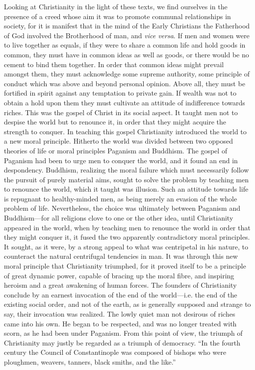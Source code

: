 \documentclass{book}
\begin{document}
Looking at Christianity in the light of these texts, we find ourselves in the presence of a creed whose aim it was to promote communal relationships in society, for it is manifest that in the mind of the Early Christians the Fatherhood of God involved the Brotherhood of man, and \emph{vice versa}. If men and women were to live together as equals, if they were to share a common life and hold goods in common, they must have in common ideas as well as goods, or there would be no cement to bind them together. In order that common ideas might prevail amongst them, they must acknowledge some supreme authority, some principle of conduct which was above and beyond personal opinion. Above all, they must be fortified in spirit against any temptation to private gain. If wealth was not to obtain a hold upon them they must cultivate an attitude of indifference towards riches. This was the gospel of Christ in its social aspect. It taught men not to despise the world but to renounce it, in order that they might acquire the strength to conquer. In teaching this gospel Christianity introduced the world to a new moral principle. Hitherto the world was divided between two opposed theories of life or moral principles Paganism and Buddhism. The gospel of Paganism had been to urge men to conquer the world, and it found an end in despondency. Buddhism, realizing the moral failure which must necessarily follow the pursuit of purely material aims, sought to solve the problem by teaching men to renounce the world, which it taught was illusion. Such an attitude towards life is repugnant to healthy-minded men, as being merely an evasion of the whole problem of life. Nevertheless, the choice was ultimately between Paganism and Buddhism—for all religions clove to one or the other idea, until Christianity appeared in the world, when by teaching men to renounce the world in order that they might conquer it, it fused the two apparently contradictory moral principles. It sought, as it were, by a strong appeal to what was centripetal in his nature, to counteract the natural centrifugal tendencies in man. It was through this new moral principle that Christianity triumphed, for it proved itself to be a principle of great dynamic power, capable of bracing up the moral fibre, and inspiring heroism and a great awakening of human forces. The founders of Christianity conclude by an earnest invocation of the end of the world—i.e. the end of the existing social order, and not of the earth, as is generally supposed and strange to say, their invocation was realized. The lowly quiet man not desirous of riches came into his own. He began to be respected, and was no longer treated with scorn, as he had been under Paganism. From this point of view, the triumph of Christianity may justly be regarded as a triumph of democracy. “In the fourth century the Council of Constantinople was composed of bishops who were ploughmen, weavers, tanners, black smiths, and the like.”\footnotemark[1]
\end{document}
